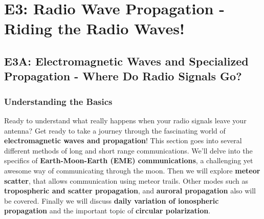 
\chapter{E3: Radio Wave Propagation - Riding the Radio Waves!}

\section{E3A: Electromagnetic Waves and Specialized Propagation - Where Do Radio Signals Go?}

\subsection*{Understanding the Basics}
Ready to understand what really happens when your radio signals leave your antenna? Get ready to take a journey through the fascinating world of \textcolor{myblue}{\textbf{electromagnetic waves and propagation}}! This section goes into several different methods of long and short range communications.
We'll delve into the specifics of \textcolor{myblue}{\textbf{Earth-Moon-Earth (EME) communications}}, a challenging yet awesome way of communicating through the moon. Then we will explore \textcolor{myblue}{\textbf{meteor scatter}}, that allows communication using meteor trails. Other modes such as \textcolor{myblue}{\textbf{tropospheric and scatter propagation}}, and \textcolor{myblue}{\textbf{auroral propagation}} also will be covered. Finally we will discuss \textcolor{myblue}{\textbf{daily variation of ionospheric propagation}} and the important topic of \textcolor{myblue}{\textbf{circular polarization}}.
